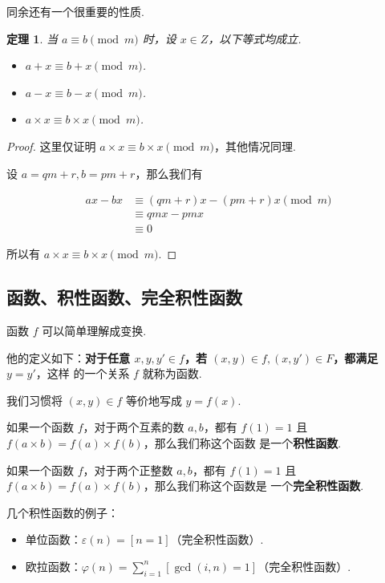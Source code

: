 \documentclass[a4paper]{article}
\newtheorem{theorem}{定理}[section]
\begin{document}
同余还有一个很重要的性质.

\begin{theorem}
    当 $a\equiv b \pmod m$ 时，设 $x\in Z$，以下等式均成立.

    \begin{itemize}
        \item $a+x \equiv b+x \pmod m$.
        \item $a-x \equiv b-x \pmod m$.
        \item $a\times x \equiv b\times x \pmod m$.
    \end{itemize}
\end{theorem}

\begin{proof}
    这里仅证明 $a\times x \equiv b\times x \pmod m$，其他情况同理.

    设 $a=qm+r,b=pm+r$，那么我们有

    \begin{equation*}
        \begin{split}
            ax-bx &\equiv (qm+r)x-(pm+r)x\pmod m\\
            &\equiv qmx-pmx\\
            &\equiv 0
        \end{split}
    \end{equation*}

    所以有 $a\times x \equiv b\times x \pmod m$.
\end{proof}

\subsection{函数、积性函数、完全积性函数}

函数 $f$ 可以简单理解成变换.

他的定义如下：\textbf{对于任意 $x,y,y'\in f$，若 $(x,y)\in f,(x,y')\in F$，都满足 $y=y'$}，这样
的一个关系 $f$ 就称为函数.

我们习惯将 $(x,y)\in f$ 等价地写成 $y=f(x)$.

如果一个函数 $f$，对于两个互素的数 $a,b$，都有 $f(1)=1$ 且 $f(a\times b) = f(a)\times f(b)$，那么我们称这个函数
是一个\textbf{积性函数}.

如果一个函数 $f$，对于两个正整数 $a,b$，都有 $f(1)=1$ 且 $f(a\times b) = f(a)\times f(b)$，那么我们称这个函数是
一个\textbf{完全积性函数}.

几个积性函数的例子：

\begin{itemize}
    \item 单位函数：$\varepsilon(n)=[n=1]$（完全积性函数）.
    \item 欧拉函数：$\varphi(n)=\sum\limits_{i=1}^n[\gcd(i,n)=1]$（完全积性函数）.
\end{itemize}
\end{document}
